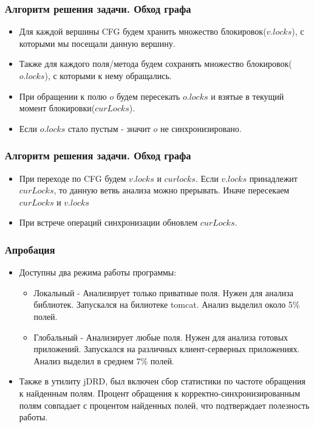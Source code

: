 \documentclass[t]{beamer}  %
\begin{document}
\begin{frame}[fragile]
  \frametitle{Алгоритм решения задачи. Обход графа}
\begin{itemize}

	\item Для каждой вершины CFG будем хранить множество блокировок($v.locks$), с которыми мы посещали данную вершину.

	\item Также для каждого поля/метода будем сохранять множество блокировок($o.locks$), с которыми к нему обращались.
	\item При обращении к полю $o$ будем пересекать $o.locks$ и взятые в текущий момент блокировки($curLocks$).
	\item Если $o.locks$ стало пустым - значит $o$ не синхронизировано.
\end{itemize}
\end{frame}


\begin{frame}[fragile]
  \frametitle{Алгоритм решения задачи. Обход графа}
\begin{itemize}
	\item При переходе по CFG будем $v.locks$ и $curlocks$. Если $v.locks$ принадлежит $curLocks$, то данную ветвь анализа можно прерывать. Иначе пересекаем $curLocks$ и $v.locks$
	\item При встрече операций синхронизации обновлем $curLocks$.
\end{itemize}
\end{frame}

\begin{frame}[fragile]
  \frametitle{Апробация}
\begin{itemize}
	\item Доступны два режима работы программы: 
	\begin{itemize}
	\item Локальный - Анализирует только приватные поля. Нужен для анализа библиотек. Запускался на билиотеке tomcat. Анализ выделил около 5\% полей.
	
	\item Глобальный - Анализирует любые поля. Нужен для анализа готовых приложений. Запускался на различных клиент-серверных приложениях. Анализ выделил в среднем 7\% полей.
	\end{itemize}
	\item Также в утилиту jDRD, был включен сбор статистики по частоте обращения к найденным полям. Процент обращения к корректно-синхронизированным полям совпадает с процентом найденных полей, что подтверждает полезность работы.
\end{itemize}
\end{frame}
\end{document}
